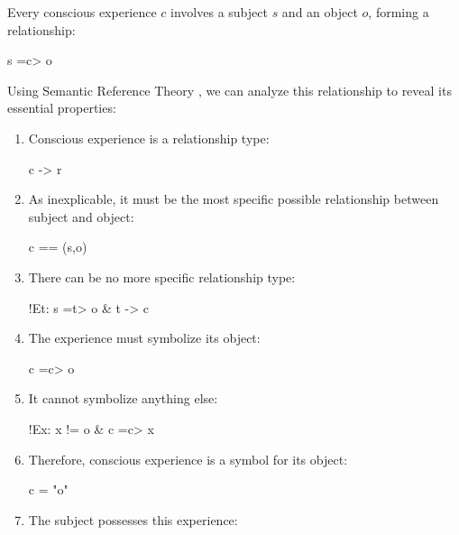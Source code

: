 \documentclass[runningheads]{llncs}
\begin{document}
Every conscious experience $c$ involves a subject $s$ and an object $o$, forming a relationship:

\begin{center}
s =c> o
\end{center}

Using Semantic Reference Theory \cite{Formalism}, we can analyze this relationship to reveal its essential properties:

\begin{enumerate}
    \item Conscious experience is a relationship type: 
    
    \begin{center}
    c -> r
    \end{center}
    
    \item As inexplicable, it must be the most specific possible relationship between subject and object: 
    
    \begin{center}
    c == (s,o)
    \end{center}
    
    \item There can be no more specific relationship type: 
    
    \begin{center}
    !Et: s =t> o \& t -> c
    \end{center}
    
    \item The experience must symbolize its object: 
    
    \begin{center}
    c =c> o
    \end{center}
    
    \item It cannot symbolize anything else: 
    
    \begin{center}
    !Ex: x != o \& c =c> x
    \end{center}
    
    \item Therefore, conscious experience is a symbol for its object:
    
    \begin{center}
    c = "o"
    \end{center}
    
    \item The subject possesses this experience: 
    

\end{enumerate}
\end{document}
